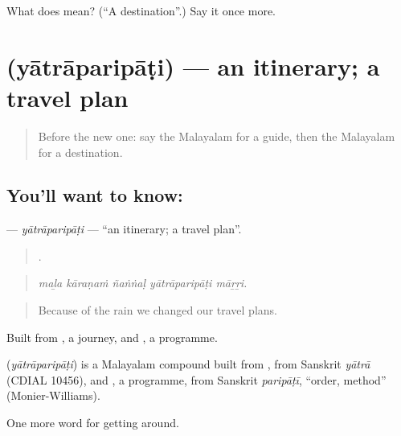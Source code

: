 \begin{tcolorbox}[breakable,colback=teal!4,colframe=teal!35!black,title={Before you move on}]
What does  mean? (\textquotedblleft{}A destination\textquotedblright{}.) Say it once more.
\end{tcolorbox}
\section[\texorpdfstring{\ml{യാത്രാപരിപാടി} (yātrāparipāṭi)}{യാത്രാപരിപാടി (yātrāparipāṭi)}]{ (yātrāparipāṭi) — an itinerary; a travel plan}

\label{lesson:ML-C478-yatraparipati}



\begin{quote}
Before the new one: say the Malayalam for a guide, then the Malayalam for a destination.
\end{quote}

\subsection*{You'll want to know: }
\textbf{} — \emph{yātrāparipāṭi} — \textquotedblleft{}an itinerary; a travel plan\textquotedblright{}.

\begin{quote}
    .
\end{quote}

\begin{quote}
\emph{maḻa kāraṇaṁ ñaṅṅaḷ yātrāparipāṭi māṟṟi.}
\end{quote}

\begin{quote}
Because of the rain we changed our travel plans.
\end{quote}

Built from , a journey, and , a programme.

\begin{cousinweb}
\textbf{} (\emph{yātrāparipāṭi}) is a Malayalam compound built from , from Sanskrit \emph{yātrā} (CDIAL 10456), and , a programme, from Sanskrit \emph{paripāṭī}, \textquotedblleft{}order, method\textquotedblright{} (Monier-Williams).
\end{cousinweb}

\begin{grammarlens}[title={What you've built}]
One more word for getting around.
\end{grammarlens}

